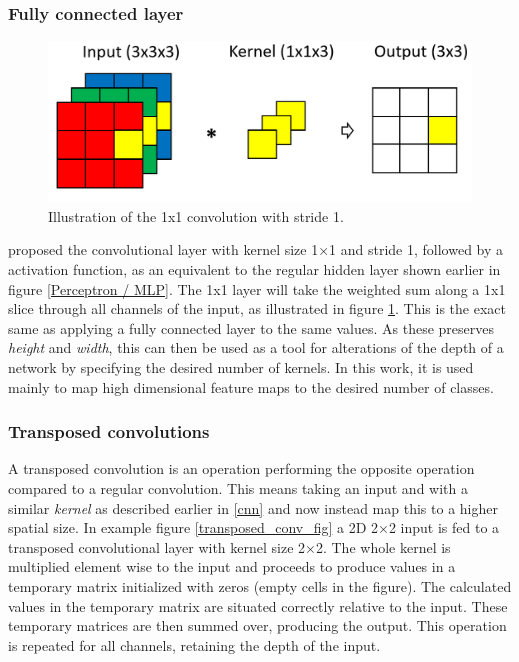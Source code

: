 \subsubsection{Fully connected layer}
    \begin{figure}[H]
        \centering
        \includegraphics[scale=0.35]{figures/1x1.png}
        \caption[1x1 convolution]{Illustration of the 1x1 convolution with stride 1.}
      	\medskip 
        \label{1x1_fig}
    \end{figure}
    \citeauthor{lin2013network_in_network_1x1}\cite{lin2013network_in_network_1x1} proposed the convolutional layer with kernel size 1×1 and stride 1, followed by a activation function, as an equivalent to the regular hidden layer shown earlier in figure \ref{Perceptron / MLP}\cite{lin2013network_in_network_1x1}. The 1x1 layer will take the weighted sum along a 1x1 slice through all channels of the input, as illustrated in figure \ref{1x1_fig}. This is the exact same as applying a fully connected layer to the same values. As these preserves \textit{height} and \textit{width}, this can then be used as a tool for alterations of the depth of a network by specifying the desired number of kernels. In this work, it is used mainly to map high dimensional feature maps to the desired number of classes.
    
    

\subsubsection{Transposed convolutions}
    A transposed convolution is an operation performing the opposite operation compared to a regular convolution\cite{dumoulin2016guide_transposed_convolution}. This means taking an input and with a similar \textit{kernel} as described earlier in \ref{cnn} and now instead map this to a higher spatial size. In example figure \ref{transposed_conv_fig} a 2D 2×2 input is fed to a transposed convolutional layer with kernel size 2×2. The whole kernel is multiplied element wise to the input and proceeds to produce values in a temporary matrix initialized with zeros (empty cells in the figure). The calculated values in the temporary matrix are situated correctly relative to the input. These temporary matrices are then summed over, producing the output. This operation is repeated for all channels, retaining the depth of the input. 
    
